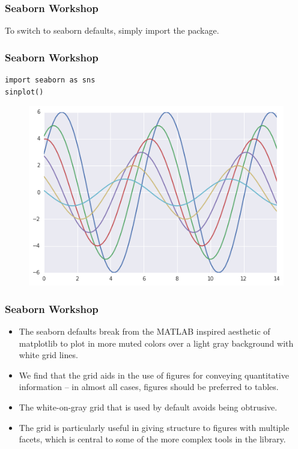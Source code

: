 \documentclass{beamer}
\begin{document}
\begin{frame}[fragile]
	\frametitle{Seaborn Workshop}
	\large
To switch to seaborn defaults, simply import the package.
\end{frame}
\begin{frame}[fragile]
	\frametitle{Seaborn Workshop}
	\large
\begin{verbatim}
import seaborn as sns
sinplot()
\end{verbatim}

\begin{figure}
\centering
\includegraphics[width=0.7\linewidth]{images/aesthetics_10_0}
\caption{}
\label{fig:aesthetics_10_0}
\end{figure}


\end{frame}
\begin{frame}[fragile]
\frametitle{Seaborn Workshop}
\large
\begin{itemize}
\item The seaborn defaults break from the MATLAB inspired aesthetic of matplotlib to plot in more muted colors over a light gray background with white grid lines. 
\item We find that the grid aids in the use of figures for conveying quantitative information – in almost all cases, figures should be preferred to tables. 
\item The white-on-gray grid that is used by default avoids being obtrusive. 
\item The grid is particularly useful in giving structure to figures with multiple facets, which is central to some of the more complex tools in the library.
\end{itemize}

\end{frame}
\end{document}
